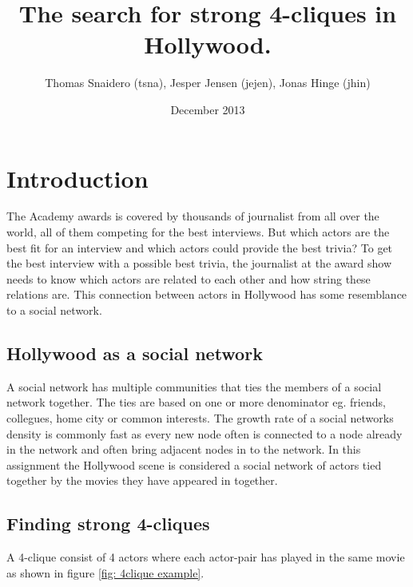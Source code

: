 \documentclass{article}
\title{The search for strong 4-cliques in Hollywood.}
\author{Thomas Snaidero (tsna), Jesper Jensen (jejen), Jonas Hinge (jhin)}
\date{December 2013}
\begin{document}
\maketitle

\section{Introduction}
The Academy awards is covered by thousands of journalist from all over the world, all of them competing for the best interviews. But which actors are the best fit for an interview and which actors could provide the best trivia?
To get the best interview with a possible best trivia, the journalist at the award show needs to know which actors are related to each other and how string these relations are. This connection between actors in Hollywood has some resemblance to a social network.

\subsection{Hollywood as a social network}
A social network has multiple communities that ties the members of a social network together. The ties are based on one or more denominator eg. friends, collegues, home city or common interests.
The growth rate of a social networks density is commonly fast as every new node often is connected to a node already in the network and often bring adjacent nodes in to the network. In this assignment the Hollywood scene is considered a social network of actors tied together by the movies they have appeared in together.

\subsection{Finding strong 4-cliques}
A 4-clique consist of 4 actors where each actor-pair has played in the same movie as shown in figure \ref{fig: 4clique example}.
\end{document}
